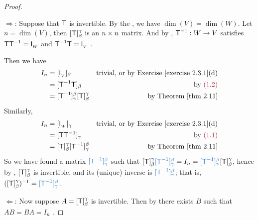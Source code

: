 \begin{proof} \ 

\(\Longrightarrow\): Suppose that \(\textsf{T}\) is invertible.
By the , we have \(\dim(V) = \dim(W)\).
Let \(n = \dim(V)\), then \([\textsf{T}]_{\beta}^{\gamma}\) is an \(n \times n\) matrix.
And by , \(\textsf{T}^{-1} : W \to V\) satisfies \(\textsf{T}\textsf{T}^{-1} = \textsf{I}_{_W}\)  and \(\textsf{T}^{-1}\textsf{T} = \textsf{I}_{_V}\) .

Then we have
\begin{align*}
    I_n & = [\ITRANV]_{\beta} & \text{trivial, or by \EXEC{2.3.1}(d)} \\
        & = [\T^{-1}\T]_{\beta} & \text{by \MAROON{(1.2)}} \\
        & = [\T^{-1}]_{\gamma}^{\beta} [\T]_{\beta}^{\gamma} & \text{by \THM{2.11}}
\end{align*}
Similarly,
\begin{align*}
    I_n & = [\ITRANW]_{\gamma} & \text{trivial, or by \EXEC{2.3.1}(d)} \\
        & = [\T\T^{-1}]_{\gamma} & \text{by \MAROON{(1.1)}} \\
        & = [\T]_{\beta}^{\gamma} [\T^{-1}]_{\gamma}^{\beta} & \text{by \THM{2.11}}
\end{align*}
So we have found a matrix \( \BLUE{[\T^{-1}]_{\gamma}^{\beta}}\) such that \([\T]_{\beta}^{\gamma} \BLUE{[\T^{-1}]_{\gamma}^{\beta}} = I_n = \BLUE{[\T^{-1}]_{\gamma}^{\beta}} [\T]_{\beta}^{\gamma}\),
hence by , \([\textsf{T}]_{\beta}^{\gamma}\) is invertible, and its (unique) inverse is \(\BLUE{[\T^{-1}]_{\gamma}^{\beta}}\);
that is, \(([\T]_{\beta}^{\gamma})^{-1} = \BLUE{[\T^{-1}]_{\gamma}^{\beta}}\).

\(\Longleftarrow\): Now suppose \(A = [\textsf{T}]_{\beta}^{\gamma}\)  is invertible.
Then by  there exists \(B\) such that \(AB = BA = I_n\) .


\end{proof}
